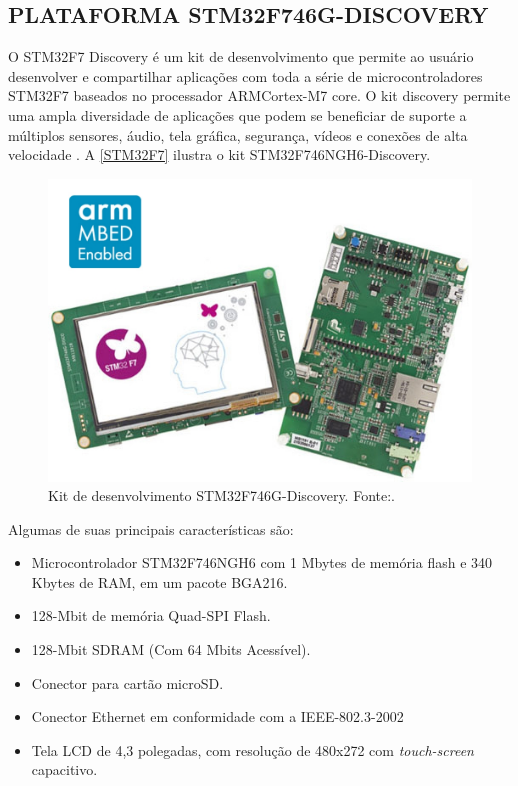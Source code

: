 \subsection{PLATAFORMA STM32F746G-DISCOVERY}

O STM32F7 Discovery é um kit de desenvolvimento que permite ao usuário desenvolver e compartilhar aplicações com toda a série de microcontroladores STM32F7 baseados no processador ARM\textregistered  Cortex\textregistered-M7 core.
O kit discovery permite uma ampla diversidade de aplicações que podem se beneficiar de suporte a múltiplos sensores, áudio, tela gráfica, segurança, vídeos e conexões de alta velocidade \cite{STM32F7}.
A \autoref{STM32F7} ilustra o kit STM32F746NGH6-Discovery.

\begin{figure}[H]
    \scriptsize
     \centering
     \includegraphics[scale=0.4]{dados/figuras/STM32F7.jpg}
     \caption{Kit de desenvolvimento STM32F746G-Discovery. \newline Fonte:\cite{STM32F7}.}
     \label{STM32F7}
\end{figure}

Algumas de suas principais características são:
\begin{itemize}
    \item Microcontrolador STM32F746NGH6 com 1 Mbytes de memória flash e 340 Kbytes de RAM, em um pacote BGA216.
    \item 128-Mbit de memória Quad-SPI Flash.
    \item 128-Mbit SDRAM (Com 64 Mbits Acessível).
    \item Conector para cartão microSD.
    \item Conector Ethernet em conformidade com a IEEE-802.3-2002
    \item Tela LCD de 4,3 polegadas, com resolução de 480x272 com \textit{touch-screen} capacitivo.
    
\end{itemize}